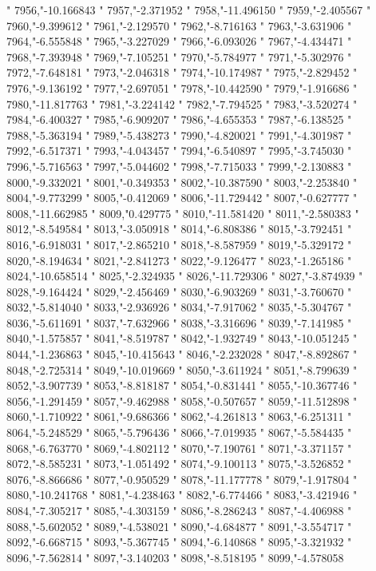 "
7956,"-10.166843
"
7957,"-2.371952
"
7958,"-11.496150
"
7959,"-2.405567
"
7960,"-9.399612
"
7961,"-2.129570
"
7962,"-8.716163
"
7963,"-3.631906
"
7964,"-6.555848
"
7965,"-3.227029
"
7966,"-6.093026
"
7967,"-4.434471
"
7968,"-7.393948
"
7969,"-7.105251
"
7970,"-5.784977
"
7971,"-5.302976
"
7972,"-7.648181
"
7973,"-2.046318
"
7974,"-10.174987
"
7975,"-2.829452
"
7976,"-9.136192
"
7977,"-2.697051
"
7978,"-10.442590
"
7979,"-1.916686
"
7980,"-11.817763
"
7981,"-3.224142
"
7982,"-7.794525
"
7983,"-3.520274
"
7984,"-6.400327
"
7985,"-6.909207
"
7986,"-4.655353
"
7987,"-6.138525
"
7988,"-5.363194
"
7989,"-5.438273
"
7990,"-4.820021
"
7991,"-4.301987
"
7992,"-6.517371
"
7993,"-4.043457
"
7994,"-6.540897
"
7995,"-3.745030
"
7996,"-5.716563
"
7997,"-5.044602
"
7998,"-7.715033
"
7999,"-2.130883
"
8000,"-9.332021
"
8001,"-0.349353
"
8002,"-10.387590
"
8003,"-2.253840
"
8004,"-9.773299
"
8005,"-0.412069
"
8006,"-11.729442
"
8007,"-0.627777
"
8008,"-11.662985
"
8009,"0.429775
"
8010,"-11.581420
"
8011,"-2.580383
"
8012,"-8.549584
"
8013,"-3.050918
"
8014,"-6.808386
"
8015,"-3.792451
"
8016,"-6.918031
"
8017,"-2.865210
"
8018,"-8.587959
"
8019,"-5.329172
"
8020,"-8.194634
"
8021,"-2.841273
"
8022,"-9.126477
"
8023,"-1.265186
"
8024,"-10.658514
"
8025,"-2.324935
"
8026,"-11.729306
"
8027,"-3.874939
"
8028,"-9.164424
"
8029,"-2.456469
"
8030,"-6.903269
"
8031,"-3.760670
"
8032,"-5.814040
"
8033,"-2.936926
"
8034,"-7.917062
"
8035,"-5.304767
"
8036,"-5.611691
"
8037,"-7.632966
"
8038,"-3.316696
"
8039,"-7.141985
"
8040,"-1.575857
"
8041,"-8.519787
"
8042,"-1.932749
"
8043,"-10.051245
"
8044,"-1.236863
"
8045,"-10.415643
"
8046,"-2.232028
"
8047,"-8.892867
"
8048,"-2.725314
"
8049,"-10.019669
"
8050,"-3.611924
"
8051,"-8.799639
"
8052,"-3.907739
"
8053,"-8.818187
"
8054,"-0.831441
"
8055,"-10.367746
"
8056,"-1.291459
"
8057,"-9.462988
"
8058,"-0.507657
"
8059,"-11.512898
"
8060,"-1.710922
"
8061,"-9.686366
"
8062,"-4.261813
"
8063,"-6.251311
"
8064,"-5.248529
"
8065,"-5.796436
"
8066,"-7.019935
"
8067,"-5.584435
"
8068,"-6.763770
"
8069,"-4.802112
"
8070,"-7.190761
"
8071,"-3.371157
"
8072,"-8.585231
"
8073,"-1.051492
"
8074,"-9.100113
"
8075,"-3.526852
"
8076,"-8.866686
"
8077,"-0.950529
"
8078,"-11.177778
"
8079,"-1.917804
"
8080,"-10.241768
"
8081,"-4.238463
"
8082,"-6.774466
"
8083,"-3.421946
"
8084,"-7.305217
"
8085,"-4.303159
"
8086,"-8.286243
"
8087,"-4.406988
"
8088,"-5.602052
"
8089,"-4.538021
"
8090,"-4.684877
"
8091,"-3.554717
"
8092,"-6.668715
"
8093,"-5.367745
"
8094,"-6.140868
"
8095,"-3.321932
"
8096,"-7.562814
"
8097,"-3.140203
"
8098,"-8.518195
"
8099,"-4.578058
